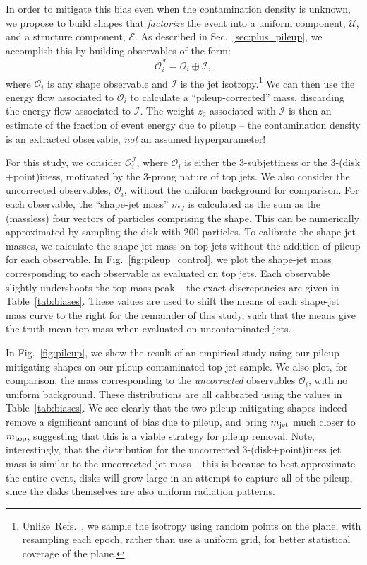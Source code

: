 \documentclass[letterpaper,11pt]{article}
\newcommand{\E}{\mathcal{E}}
\renewcommand{\O}{\mathcal{O}}
\DeclareRobustCommand{\Sec}[1]{Sec.~\ref{sec:#1}}
\DeclareRobustCommand{\Tab}[1]{Table~\ref{tab:#1}}
\DeclareRobustCommand{\Fig}[1]{Fig.~\ref{fig:#1}}
\DeclareRobustCommand{\Refers}[1]{Refs.~\cite{#1}}
\begin{document}
In order to mitigate this bias even when the contamination density is unknown, we propose to build shapes that \emph{factorize} the event into a uniform component, $\mathcal{U}$, and a structure component, $\E$. As described in \Sec{plus_pileup}, we accomplish this by building observables of the form:
%
\begin{align}
  \O^\mathcal{I}_i = \O_i \oplus \mathcal{I},  
\end{align}
%
 where $\O_i$ is any shape observable and $\mathcal{I}$ is the jet isotropy.\footnote{Unlike~\Refers{Cesarotti:2020hwb,Cesarotti_2021}, we sample the isotropy using random points on the plane, with resampling each epoch, rather than use a uniform grid, for better statistical coverage of the plane.} We can then use the energy flow associated to $\O_i$ to calculate a ``pileup-corrected'' mass, discarding the energy flow associated to $\mathcal{I}$. The weight $z_2$ associated with $\mathcal{I}$ is then an estimate of the fraction of event energy due to pileup -- the contamination density is an extracted observable, \textit{not} an assumed hyperparameter!

 For this study, we consider $\mathcal{O}_i^{\mathcal{I}}$, where $\mathcal{O}_i$ is either the 3-subjettiness or the 3-(disk$+$point)\-iness, motivated by the 3-prong nature of top jets. We also consider the uncorrected observables, $\mathcal{O}_i$, without the uniform background for comparison. For each observable, the ``shape-jet mass'' $m_J$ is calculated as the sum as the (massless) four vectors of particles comprising the shape. This can be numerically approximated by sampling the disk with 200 particles. To calibrate the shape-jet masses, we calculate the shape-jet mass on top jets without the addition of pileup for each observable. In \Fig{pileup_control}, we plot the shape-jet mass corresponding to each observable as evaluated on top jets. Each observable slightly undershoots the top mass peak -- the exact discrepancies are given in \Tab{biases}. These values are used to shift the means of each shape-jet mass curve to the right for the remainder of this study, such that the means give the truth mean top mass when evaluated on uncontaminated  jets.


In \Fig{pileup}, we show the result of an empirical study using our pileup-mitigating shapes on our pileup-contaminated top jet sample. We also plot, for comparison, the mass corresponding to the \emph{uncorrected} observables $\mathcal{O}_i$, with no uniform background. These distributions are all calibrated using the values in \Tab{biases}. We see clearly that the two pileup-mitigating shapes indeed remove a significant amount of bias due to pileup, and bring $m_{\rm jet}$ much closer to $m_{\rm top}$, suggesting that this is a viable strategy for pileup removal. Note, interestingly, that the distribution for the uncorrected 3-(disk$+$point)iness jet mass is similar to the uncorrected jet mass -- this is because to best approximate the entire event, disks will grow large in an attempt to capture all of the pileup, since the disks themselves are also uniform radiation patterns.
\end{document}
